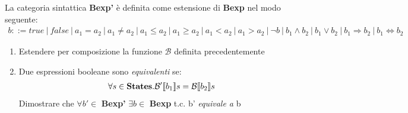 {
La categoria sintattica \textbf{Bexp'} è definita come estensione di 
\textbf{Bexp} nel modo seguente:
\begin{align*}
b ::= true \
| \ false \ 
| \ a_1 = a_2 \
| \ a_1 \not = a_2 \
| \ a_1 \leq a_2 \
| \ a_1 \geq a_2 \
| \ a_1 < a_2 \
| \ a_1 > a_2 \
| \ \lnot b \
| \ b_1 \land b_2 \
| \ b_1 \lor b_2 \
| \ b_1 \Rightarrow b_2 \
| \ b_1 \Leftrightarrow b_2    
\end{align*}
\begin{enumerate}[label=(\alph*)]
  \item Estendere per composizione la funzione $\mathcal{B}$ definita 
precedentemente
  \item Due espressioni booleane sono \textit{equivalenti} se:  
    \begin{align*}
      \forall s \in \mbox{\textbf{States}}.\mathcal{B'} \llbracket b_1 \rrbracket s = \mathcal{B} \llbracket b_2 \rrbracket s
    \end{align*}
    Dimostrare che $\forall b' \in$ \textbf{Bexp'} $\exists b \in$ 
\textbf{Bexp} t.c. b' \textit{equivale a} b
\end{enumerate}
}%
